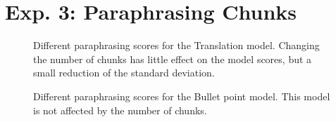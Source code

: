 \section{Exp. 3: Paraphrasing Chunks}
\label{sec:app_chunks}

\begin{figure}[H]
    \centering
    
    \caption[Paraphrasing scores for the Translation model.]{Different paraphrasing scores for the Translation model. 
    Changing the number of chunks has little effect on the model scores, but a small reduction of the standard deviation.}
    \label{fig:abl_chunks_gutenberg_translation}
\end{figure}

\begin{figure}[H]
    \centering
    
    \caption[Paraphrasing scores for the Bullet point model.]{Different paraphrasing scores for the Bullet point model. 
    This model is not affected by the number of chunks.}
    \label{fig:abl_chunks_student_essays_task}
\end{figure}